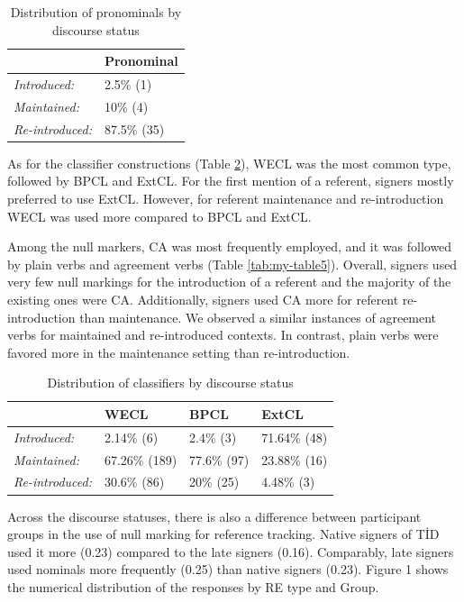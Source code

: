 \documentclass[]{elsarticle} %
\begin{document}
\begin{table}
\small
\caption{Distribution of pronominals by discourse status}
\label{tab:my-table3}
\begin{tabular}{ll}
\hline
                        & Pronominal  \\ \hline
\textit{Introduced:}    & 2.5\% (1)   \\
\textit{Maintained:}    & 10\% (4)    \\
\textit{Re-introduced:} & 87.5\% (35) \\ \hline
\end{tabular}
\end{table}

As for the classifier constructions (Table \ref{tab:my-table4}), WECL
was the most common type, followed by BPCL and ExtCL. For the first
mention of a referent, signers mostly preferred to use ExtCL. However,
for referent maintenance and re-introduction WECL was used more compared
to BPCL and ExtCL.

Among the null markers, CA was most frequently employed, and it was
followed by plain verbs and agreement verbs (Table \ref{tab:my-table5}).
Overall, signers used very few null markings for the introduction of a
referent and the majority of the existing ones were CA. Additionally,
signers used CA more for referent re-introduction than maintenance. We
observed a similar instances of agreement verbs for maintained and
re-introduced contexts. In contrast, plain verbs were favored more in
the maintenance setting than re-introduction.

\begin{table}
\small
\caption{Distribution of classifiers by discourse status}
\label{tab:my-table4}
\begin{tabular}{llll}
\hline
                        & WECL          & BPCL        & ExtCL         \\ \hline
\textit{Introduced:}    & 2.14\% (6)    & 2.4\% (3)   & 71.64\% (48) \\
\textit{Maintained:}    & 67.26\% (189) & 77.6\% (97) & 23.88\% (16) \\
\textit{Re-introduced:} & 30.6\% (86)   & 20\% (25)   & 4.48\% (3)   \\ \hline
\end{tabular}
\end{table}

Across the discourse statuses, there is also a difference between
participant groups in the use of null marking for reference tracking.
Native signers of TİD used it more (0.23) compared to the late signers
(0.16). Comparably, late signers used nominals more frequently (0.25)
than native signers (0.23). Figure 1 shows the numerical distribution of
the responses by RE type and Group.
\end{document}
